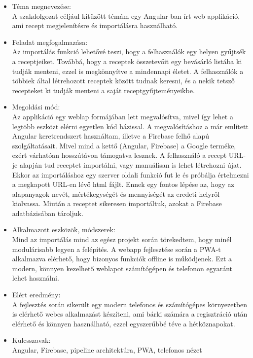 \documentclass[12pt]{report}
\theoremstyle{definition}
\begin{document}
\begin{itemize}
	\item Téma  megnevezése: \\
	A szakdolgozat céljául kitűzött témám egy Angular-ban írt web applikáció, ami recept megjelenítésre és importálásra használható.
	\item Feladat  megfogalmazása: \\
	Az importálás funkció lehetővé teszi, hogy a felhasználók egy helyen gyűjtsék a receptjeiket. Továbbá, hogy a receptek összetevőit egy bevásárló listába ki tudják menteni, ezzel is megkönnyítve a mindennapi életet. A felhasználók a többiek által létrehozott receptek között tudnak keresni, és a nekik tetsző recepteket ki tudják menteni a saját receptgyűjteményeikbe.
	\item Megoldási  mód: \\
	Az applikáció egy weblap formájában lett megvalósítva, mivel így lehet a legtöbb eszközt elérni egyetlen kód bázissal. A megvalósításhoz a már említett Angular keretrendszert használtam, illetve a Firebase felhő alapú szolgáltatásait. Mivel mind a kettő (Angular, Firebase) a Google terméke, ezért várhatóan hosszútávon támogatva lesznek. A felhasználó a recept URL-je alapján tud receptet importálni, vagy manuálisan is lehet létrehozni újat. Ekkor az importáláshoz egy szerver oldali funkció fut le és próbálja értelmezni a megkapott URL-en lévő html fájlt. Ennek egy fontos lépése az, hogy az alapanyagok nevét, mértékegységét és mennyiségét az eredeti helyről kiolvassa. Miután a receptet sikeresen importáltuk, azokat a Firebase adatbázisában tároljuk.
	\item Alkalmazott  eszközök, módszerek: \\
	Mind az importálás mind az egész projekt során törekedtem, hogy minél modulárisabb legyen a felépítés. A webapp fejlesztése során a PWA-t alkalmazva elérhető, hogy bizonyos funkciók offline is működjenek. Ezt a modern, könnyen kezelhető weblapot számítógépen és telefonon egyaránt lehet használni.
	\item Elért  eredmény: \\
	A fejlesztés során sikerült egy modern telefonos és számítógépes környezetben is elérhető webes alkalmazást készíteni, ami bárki számára a regisztráció után elérhető és könnyen használható, ezzel egyszerűbbé téve a hétköznapokat.
	\item Kulcsszavak: \\
	Angular, Firebase, pipeline architektúra, PWA, telefonos nézet
\end{itemize}
\end{document}
